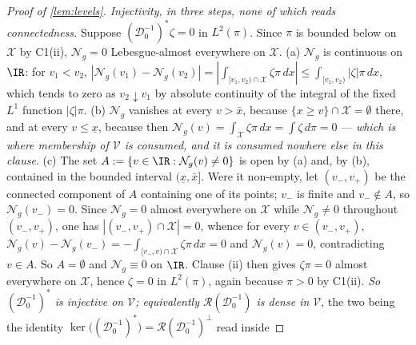 \begin{proof}[Proof of \cref{lem:levels}]
\emph{Injectivity, in three steps, none of which reads connectedness.} Suppose
$(\mathcal D^{-1}_0)^{\ast}\zeta=0$ in $L^{2}(\pi)$. Since $\pi$ is bounded below on $\mathcal X$ by
C1(ii), $\mathcal N_g=0$ Lebesgue-almost everywhere on $\mathcal X$. \textup{(a)} $\mathcal N_g$ is
continuous on $\IR$: for $v_1<v_2$,
$|\mathcal N_g(v_1)-\mathcal N_g(v_2)|=|\int_{[v_1,v_2)\cap\mathcal X}\zeta\pi\,dx|\le\int_{[v_1,v_2)}|\zeta|\pi\,dx$,
which tends to zero as $v_2\downarrow v_1$ by absolute continuity of the integral of the fixed
$L^{1}$ function $|\zeta|\pi$. \textup{(b)} $\mathcal N_g$ vanishes at every $v>\bar x$, because
$\{x\ge v\}\cap\mathcal X=\emptyset$ there, and at every $v\le\underline x$, because then
$\mathcal N_g(v)=\int_{\mathcal X}\zeta\pi\,dx=\int\zeta\,d\pi=0$ --- \emph{which is where membership of
$\mathcal V$ is consumed, and it is consumed nowhere else in this clause}. \textup{(c)} The set
$A:=\{v\in\IR:\mathcal N_g(v)\ne0\}$ is open by \textup{(a)} and, by \textup{(b)}, contained in the
bounded interval $(\underline x,\bar x]$.
Were it
non-empty, let $(v_-,v_+)$ be the connected component of $A$ containing one of its points; $v_-$
is finite and $v_-\notin A$, so $\mathcal N_g(v_-)=0$. Since $\mathcal N_g=0$ almost everywhere on
$\mathcal X$ while $\mathcal N_g\ne0$ throughout $(v_-,v_+)$, one has
$|(v_-,v_+)\cap\mathcal X|=0$, whence for every $v\in(v_-,v_+)$,
$\mathcal N_g(v)-\mathcal N_g(v_-)=-\int_{[v_-,v)\cap\mathcal X}\zeta\pi\,dx=0$ and
$\mathcal N_g(v)=0$, contradicting $v\in A$. So $A=\emptyset$ and $\mathcal N_g\equiv0$ on $\IR$.
Clause \textup{(ii)} then gives $\zeta\pi=0$ almost everywhere on $\mathcal X$, hence $\zeta=0$ in
$L^{2}(\pi)$, again because $\pi>0$ by C1(ii). \emph{So $(\mathcal D^{-1}_0)^{\ast}$ is injective on
$\mathcal V$; equivalently $\mathcal R(\mathcal D^{-1}_0)$ is dense in $\mathcal V$}, the two being the
identity $\ker\big((\mathcal D^{-1}_0)^{\ast}\big)=\mathcal R(\mathcal D^{-1}_0)^{\perp}$ read inside

\end{proof}
